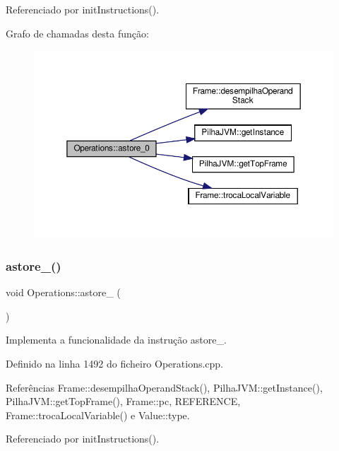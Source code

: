 Referenciado por init\+Instructions().

Grafo de chamadas desta função\+:\nopagebreak
\begin{figure}[H]
\begin{center}
\leavevmode
\includegraphics[width=350pt]{classOperations_a140f2e8501424f8a73dbfecfa3ca859f_cgraph}
\end{center}
\end{figure}
\mbox{\label{classOperations_a1a7a41be018313dd524df5327c8b6035}} 
\subsubsection{\texorpdfstring{astore\+\_()}{astore\_1()}}
{\footnotesize\ttfamily void Operations\+::astore\+\_ (\begin{DoxyParamCaption}{ }\end{DoxyParamCaption})\hspace{0.3cm}{\ttfamily [private]}}



Implementa a funcionalidade da instrução astore\+\_. 



Definido na linha 1492 do ficheiro Operations.\+cpp.



Referências Frame\+::desempilha\+Operand\+Stack(), Pilha\+J\+V\+M\+::get\+Instance(), Pilha\+J\+V\+M\+::get\+Top\+Frame(), Frame\+::pc, R\+E\+F\+E\+R\+E\+N\+CE, Frame\+::troca\+Local\+Variable() e Value\+::type.



Referenciado por init\+Instructions().

